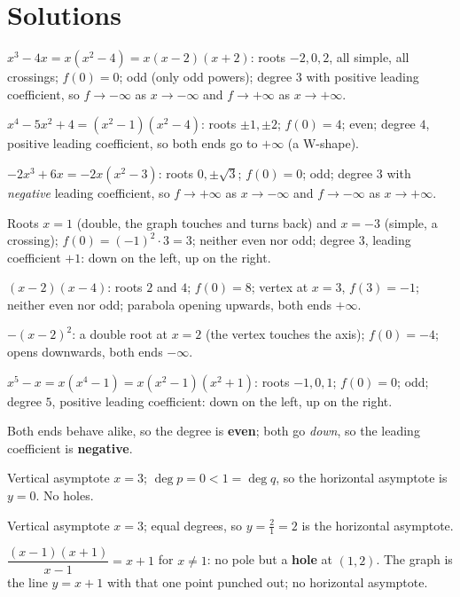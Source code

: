 \section{Solutions}

\begin{solutions}
  \item $x^{3}-4x=x(x^{2}-4)=x(x-2)(x+2)$: roots $-2,0,2$, all simple, all
        crossings; $f(0)=0$; odd (only odd powers); degree $3$ with
        positive leading coefficient, so $f\to-\infty$ as $x\to-\infty$ and
        $f\to+\infty$ as $x\to+\infty$.
  \item $x^{4}-5x^{2}+4=(x^{2}-1)(x^{2}-4)$: roots $\pm1,\pm2$;
        $f(0)=4$; even; degree $4$, positive leading coefficient, so both
        ends go to $+\infty$ (a W-shape).
  \item $-2x^{3}+6x=-2x(x^{2}-3)$: roots $0,\pm\sqrt3$; $f(0)=0$; odd;
        degree $3$ with \emph{negative} leading coefficient, so
        $f\to+\infty$ as $x\to-\infty$ and $f\to-\infty$ as $x\to+\infty$.
  \item Roots $x=1$ (double, the graph touches and turns back) and $x=-3$
        (simple, a crossing); $f(0)=(-1)^{2}\cdot3=3$; neither even nor
        odd; degree $3$, leading coefficient $+1$: down on the left, up on
        the right.
  \item $(x-2)(x-4)$: roots $2$ and $4$; $f(0)=8$; vertex at
        $x=3$, $f(3)=-1$; neither even nor odd; parabola opening upwards,
        both ends $+\infty$.
  \item $-(x-2)^{2}$: a double root at $x=2$ (the vertex touches the axis);
        $f(0)=-4$; opens downwards, both ends $-\infty$.
  \item $x^{5}-x=x(x^{4}-1)=x(x^{2}-1)(x^{2}+1)$: roots $-1,0,1$;
        $f(0)=0$; odd; degree $5$, positive leading coefficient: down on
        the left, up on the right.
  \item Both ends behave alike, so the degree is \textbf{even}; both go
        \emph{down}, so the leading coefficient is \textbf{negative}.
  \item Vertical asymptote $x=3$; $\deg p=0<1=\deg q$, so the horizontal
        asymptote is $y=0$. No holes.
  \item Vertical asymptote $x=3$; equal degrees, so
        $y=\tfrac{2}{1}=2$ is the horizontal asymptote.
  \item $\dfrac{(x-1)(x+1)}{x-1}=x+1$ for $x\neq1$: no pole but a
        \textbf{hole} at $(1,2)$. The graph is the line $y=x+1$ with that
        one point punched out; no horizontal asymptote.

\end{solutions}
